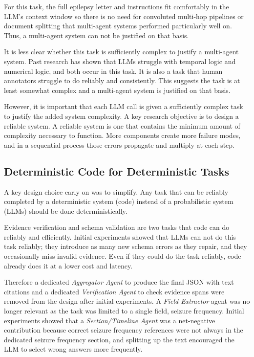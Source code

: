 \documentclass[conference]{IEEEtran}
\begin{document}
For this task, the full epilepsy letter and instructions 
fit comfortably in the LLM's context window so there
is no need for convoluted multi-hop pipelines or 
document splitting that multi-agent systems 
performed particularly well on\cite{b14}. Thus, a 
multi-agent system can not be justified on that basis.

It is less clear whether this task is sufficiently complex
to justify a multi-agent system. Past research has 
shown that LLMs struggle with temporal logic and 
numerical logic, and both occur in this task. It is
also a task that human annotators struggle to do
reliably and consistently\cite{b3}. This suggests the task 
is at least somewhat complex and a multi-agent
system is justified on that basis.

However, it is important that each LLM call is given
a sufficiently complex task to justify the added system
complexity. A key research objective is to design 
a reliable system. A reliable system is one that 
contains the minimum amount of complexity 
necessary to function. More components create 
more failure modes, and in a sequential 
process those errors propagate and multiply at 
each step. 

\subsection{Deterministic Code for Deterministic Tasks}

A key design choice early on was to simplify. Any
task that can be reliably completed by a deterministic
system (code) instead of a probabilistic system (LLMs)
should be done deterministically. 

Evidence verification and schema validation are two 
tasks that code can do reliably and efficiently. Initial 
experiments showed that LLMs can not do this task 
reliably; they introduce as many new schema errors 
as they repair, and they occasionally miss invalid 
evidence. Even if they could do the task
reliably, code already does it at a lower
cost and latency. 

Therefore a dedicated \emph{Aggregator Agent} to produce
the final JSON with text citations and a dedicated 
\emph{Verification Agent} to check evidence spans were 
removed from the design after initial experiments.
A \emph{Field Extractor} agent was no longer relevant as 
the task was limited to a single field, seizure 
frequency. Initial experiments showed that a 
\emph{Section/Timeline Agent} was a net-negative 
contribution because correct seizure frequency 
references were not always in the dedicated 
seizure frequency section, and splitting up the 
text encouraged the LLM to select wrong answers
more frequently.
\end{document}
